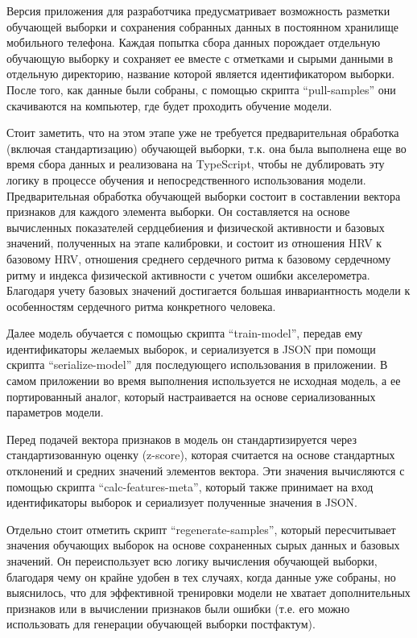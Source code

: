 \documentclass[14pt]{matmex-diploma-custom}
\begin{document}
Версия приложения для разработчика предусматривает возможность разметки
обучающей выборки и сохранения собранных данных в постоянном хранилище
мобильного телефона. Каждая попытка сбора данных порождает отдельную обучающую
выборку и сохраняет ее вместе с отметками и сырыми данными в отдельную
директорию, название которой является идентификатором выборки. После того, как
данные были собраны, с помощью скрипта ``pull-samples'' они скачиваются на
компьютер, где будет проходить обучение модели.

Стоит заметить, что на этом этапе уже не требуется предварительная обработка
(включая стандартизацию) обучающей выборки, т.к. она была выполнена еще во время
сбора данных и реализована на TypeScript, чтобы не дублировать эту логику в
процессе обучения и непосредственного использования модели. Предварительная
обработка обучающей выборки состоит в составлении вектора признаков для каждого
элемента выборки. Он составляется на основе вычисленных показателей сердцебиения
и физической активности и базовых значений, полученных на этапе калибровки, и
состоит из отношения HRV к базовому HRV, отношения среднего сердечного ритма к
базовому сердечному ритму и индекса физической активности с учетом ошибки
акселерометра. Благодаря учету базовых значений достигается большая
инвариантность модели к особенностям сердечного ритма конкретного человека.

Далее модель обучается с помощью скрипта ``train-model'', передав ему
идентификаторы желаемых выборок, и сериализуется в JSON при помощи скрипта
``serialize-model'' для последующего использования в приложении. В самом
приложении во время выполнения используется не исходная модель, а ее
портированный аналог, который настраивается на основе сериализованных параметров
модели.

Перед подачей вектора признаков в модель он стандартизируется через
стандартизованную оценку (z-score), которая считается на основе стандартных
отклонений и средних значений элементов вектора. Эти значения вычисляются с
помощью скрипта ``calc-features-meta'', который также принимает на вход
идентификаторы выборок и сериализует полученные значения в JSON.

Отдельно стоит отметить скрипт ``regenerate-samples'', который пересчитывает
значения обучающих выборок на основе сохраненных сырых данных и базовых
значений. Он переиспользует всю логику вычисления обучающей выборки, благодаря
чему он крайне удобен в тех случаях, когда данные уже собраны, но выяснилось,
что для эффективной тренировки модели не хватает дополнительных признаков
или в вычислении признаков были ошибки (т.е. его можно использовать для
генерации обучающей выборки постфактум).
\end{document}
